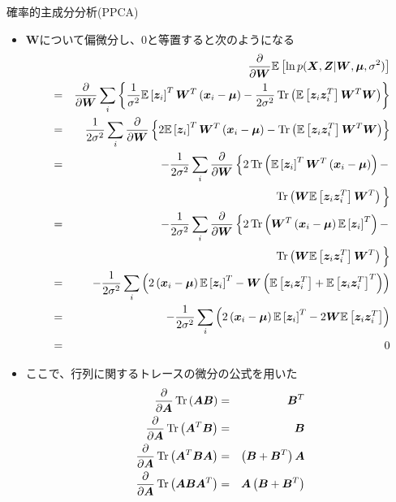 \documentclass[dvipdfmx,notheorems,t]{beamer}
\begin{document}
\begin{frame}{確率的主成分分析(PPCA)}
\begin{itemize}
\begin{itemize}
		\item $\bm{W}$について偏微分し、$0$と等置すると次のようになる
		\begin{eqnarray}
			&& \frac{\partial}{\partial \bm{W}} \mathbb{E} \left[ \ln p(\bm{X}, \bm{Z} | \bm{W}, \bm{\mu}, \sigma^2) \right] \nonumber \\
			&=& \frac{\partial}{\partial \bm{W}} \sum_i \left\{ \frac{1}{\sigma^2} \mathbb{E} \left[ \bm{z}_i \right]^T \bm{W}^T \left( \bm{x}_i - \bm{\mu} \right) - \frac{1}{2 \sigma^2} \operatorname{Tr} \left( \mathbb{E} \left[ \bm{z}_i \bm{z}_i^T \right] \bm{W}^T \bm{W} \right) \right\} \nonumber \\
			&=& \frac{1}{2 \sigma^2} \sum_i \frac{\partial}{\partial \bm{W}} \left\{ 2 \mathbb{E} \left[ \bm{z}_i \right]^T \bm{W}^T \left( \bm{x}_i - \bm{\mu} \right) - \operatorname{Tr} \left( \mathbb{E} \left[ \bm{z}_i \bm{z}_i^T \right] \bm{W}^T \bm{W} \right) \right\} \nonumber \\
			&=& -\frac{1}{2 \sigma^2} \sum_i \frac{\partial}{\partial \bm{W}} \left\{ 2 \operatorname{Tr} \left( \mathbb{E} \left[ \bm{z}_i \right]^T \bm{W}^T \left( \bm{x}_i - \bm{\mu} \right) \right) - \right. \nonumber \\
			&& \qquad \operatorname{Tr} \left( \bm{W} \mathbb{E} \left[ \bm{z}_i \bm{z}_i^T \right] \bm{W}^T \right) \Big\} \nonumber \\
			&=& -\frac{1}{2 \sigma^2} \sum_i \frac{\partial}{\partial \bm{W}} \left\{ 2 \operatorname{Tr} \left( \bm{W}^T \left( \bm{x}_i - \bm{\mu} \right) \mathbb{E} \left[ \bm{z}_i \right]^T \right) - \right. \nonumber \\
			&& \qquad \operatorname{Tr} \left( \bm{W} \mathbb{E} \left[ \bm{z}_i \bm{z}_i^T \right] \bm{W}^T \right) \Big\} \nonumber \\
			&=& -\frac{1}{2 \sigma^2} \sum_i \left( 2 \left( \bm{x}_i - \bm{\mu} \right) \mathbb{E} \left[ \bm{z}_i \right]^T - \bm{W} \left( \mathbb{E} \left[ \bm{z}_i \bm{z}_i^T \right] + \mathbb{E} \left[ \bm{z}_i \bm{z}_i^T \right]^T \right) \right) \nonumber \\
			&=& -\frac{1}{2 \sigma^2} \sum_i \left( 2 \left( \bm{x}_i - \bm{\mu} \right) \mathbb{E} \left[ \bm{z}_i \right]^T - 2 \bm{W} \mathbb{E} \left[ \bm{z}_i \bm{z}_i^T \right] \right) \nonumber \\
			&=& 0 \nonumber
		\end{eqnarray}
		
		\item ここで、行列に関するトレースの微分の公式を用いた
		\begin{eqnarray}
			\frac{\partial}{\partial \bm{A}} \operatorname{Tr} \left( \bm{A} \bm{B} \right) &=& \bm{B}^T \\
			\frac{\partial}{\partial \bm{A}} \operatorname{Tr} \left( \bm{A}^T \bm{B} \right) &=& \bm{B} \\
			\frac{\partial}{\partial \bm{A}} \operatorname{Tr} \left( \bm{A}^T \bm{B} \bm{A} \right) &=& \left( \bm{B} + \bm{B}^T \right) \bm{A} \\
			\frac{\partial}{\partial \bm{A}} \operatorname{Tr} \left( \bm{A} \bm{B} \bm{A}^T \right) &=& \bm{A} \left( \bm{B} + \bm{B}^T \right)
		\end{eqnarray}
		

\end{itemize}
\end{itemize}
\end{frame}
\end{document}
